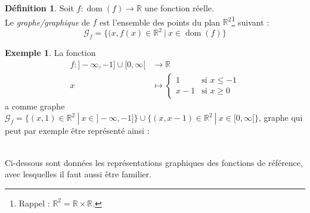 \documentclass[a4paper,13pt]{scrreprt}
\theoremstyle{plain}
\theoremstyle{definition}
\newtheorem{déf}[subsection]{Définition}
\newtheorem{exe}[subsection]{Exemple}
\newcommand{\rr}{\mathbb{R}}
\DeclareMathOperator{\dom}{dom}
\begin{document}
\begin{déf}
	Soit $f : \dom(f) \to \rr$ une fonction réelle. \\Le \emph{graphe/graphique} de $f$ est l'ensemble des points du plan ${\rr}^{2}$\footnote{Rappel : ${\rr}^{2} = \rr \times \rr$.} suivant : $${\mathcal{G}}_{f} = \{(x,f(x) \in {\rr}^{2}~|~x \in \dom(f)\}$$
\end{déf}
\begin{exe}
	La fonction \begin{align*}
	f : ]-\infty,-1] \cup [0,\infty[ &\to \rr \\
	x &\mapsto \begin{cases}
	1&\text{si $x \le -1$}\\
	x-1&\text{si $x \ge 0$}
	\end{cases}
	\end{align*}
	a comme graphe ${\mathcal{G}}_{f} = \{(x,1) \in {\rr}^{2}~|~x \in ]-\infty,-1]\} \cup \{(x,x-1) \in {\rr}^{2}~|~x \in [0,\infty[\}$, graphe qui peut par exemple être représenté ainsi :
		\begin{center}
		\end{center}
		
\end{exe}
~\\
Ci-dessous sont données les représentations graphiques des fonctions de référence, avec lesquelles il faut aussi être familier. \newpage
\end{document}
